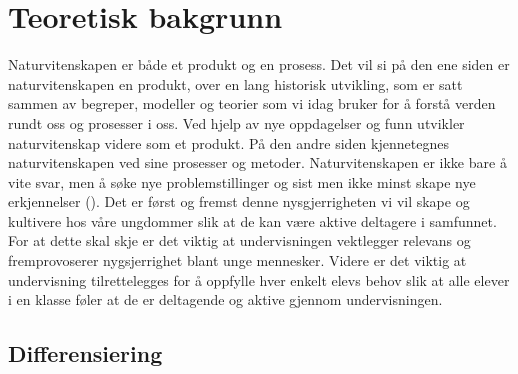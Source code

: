 \documentclass[main.tex]{subfiles}
\begin{document}
\section*{Teoretisk bakgrunn}

Naturvitenskapen er både et produkt og en prosess. Det vil si på den ene siden er naturvitenskapen en produkt, over en lang historisk utvikling, som er satt sammen av begreper, modeller og teorier som vi idag bruker for å forstå verden rundt oss og prosesser i oss. Ved hjelp av nye oppdagelser og funn utvikler naturvitenskap videre som et produkt. På den andre siden kjennetegnes naturvitenskapen ved sine prosesser og metoder. Naturvitenskapen er ikke bare å vite svar, men å søke nye problemstillinger og sist men ikke minst skape nye erkjennelser  (). Det er først og fremst denne nysgjerrigheten vi vil skape og kultivere hos våre ungdommer slik at de kan være aktive deltagere i samfunnet. For at dette skal skje er det viktig at undervisningen vektlegger relevans og fremprovoserer nygsjerrighet blant unge mennesker. Videre er det viktig at undervisning tilrettelegges for å oppfylle hver enkelt elevs behov slik at alle elever i en klasse føler at de er deltagende og aktive gjennom undervisningen.

\subsection*{Differensiering}
\end{document}
